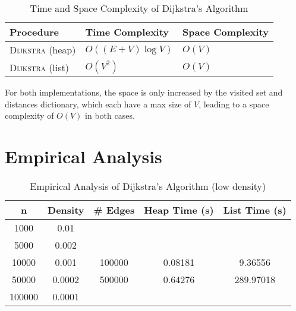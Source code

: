 \documentclass[12pt]{article}
\begin{document}
\begin{table}[h!]
    \centering
    \begin{threeparttable}
        \caption{Time and Space Complexity of Dijkstra's Algorithm}
        \begin{tabular}{@{}lll@{}}
            \toprule
            \textbf{Procedure} & \textbf{Time Complexity} & \textbf{Space Complexity} \\ \midrule
            \textsc{Dijkstra} (heap)  & $O((E+V)\log V)$        & $O(V)$                    \\
            \textsc{Dijkstra} (list)  & $O(V^2)$                & $O(V)$                    \\
            \bottomrule
        \end{tabular}
    \end{threeparttable}
\end{table}

For both implementations, the space is only increased by the visited set and
distances dictionary, which each have a max size of $V$, leading to a space
complexity of $O(V)$ in both cases. 

\section{Empirical Analysis}

\begin{table}[h!]
    \centering
    \begin{threeparttable}
        \caption{Empirical Analysis of Dijkstra's Algorithm (low density)}
        \begin{tabular}{@{}ccccc@{}}
            \toprule
            \textbf{n} & \textbf{Density} & \textbf{\# Edges} & \textbf{Heap Time (s)} & \textbf{List Time (s)} \\ \midrule
            1000         & 0.01     &              &          &           \\
            5000         & 0.002    &              &          &           \\
            10000        & 0.001    & 100000       & 0.08181  & 9.36556   \\
            50000        & 0.0002   & 500000       & 0.64276  & 289.97018 \\
            100000       & 0.0001   &              &          &           \\
            \bottomrule
        \end{tabular}
    \end{threeparttable}
\end{table}
\end{document}
